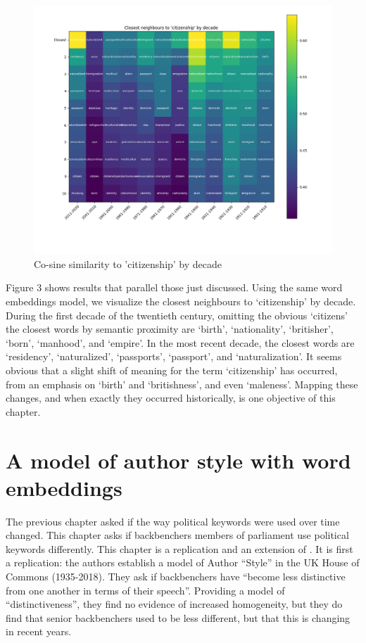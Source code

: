 \documentclass[
  openany]{book}
\begin{document}
\begin{figure}
\includegraphics[width=1\linewidth]{figures/citizenship} \caption{Co-sine similarity to 'citizenship' by decade}\label{fig:unnamed-chunk-4}
\end{figure}

Figure 3 shows results that parallel those just discussed. Using the same word embeddings model, we visualize the closest neighbours to `citizenship' by decade. During the first decade of the twentieth century, omitting the obvious `citizens' the closest words by semantic proximity are `birth', `nationality', `britisher', `born', `manhood', and `empire'. In the most recent decade, the closest words are `residency', `naturalized', `passports', `passport', and `naturalization'. It seems obvious that a slight shift of meaning for the term `citizenship' has occurred, from an emphasis on `birth' and `britishness', and even `maleness'. Mapping these changes, and when exactly they occurred historically, is one objective of this chapter.

\hypertarget{a-model-of-author-style-with-word-embeddings}{%
\chapter{A model of author style with word embeddings}\label{a-model-of-author-style-with-word-embeddings}}

The previous chapter asked if the way political keywords were used over time changed. This chapter asks if backbenchers members of parliament use political keywords differently. This chapter is a replication and an extension of \citet{huang2020general}. It is first a replication: the authors establish a model of Author ``Style'' in the UK House of Commons (1935-2018). They ask if backbenchers have ``become less distinctive from one another in terms of their speech''. Providing a model of ``distinctiveness'', they find no evidence of increased homogeneity, but they do find that senior backbenchers used to be less different, but that this is changing in recent years.
\end{document}

